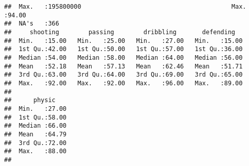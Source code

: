 \documentclass[
]{article}
\begin{document}
\begin{verbatim}
##  Max.   :195800000                                         Max.   :94.00  
##  NA's   :366                                                              
##     shooting        passing        dribbling       defending    
##  Min.   :15.00   Min.   :25.00   Min.   :27.00   Min.   :15.00  
##  1st Qu.:42.00   1st Qu.:50.00   1st Qu.:57.00   1st Qu.:36.00  
##  Median :54.00   Median :58.00   Median :64.00   Median :56.00  
##  Mean   :52.18   Mean   :57.13   Mean   :62.46   Mean   :51.71  
##  3rd Qu.:63.00   3rd Qu.:64.00   3rd Qu.:69.00   3rd Qu.:65.00  
##  Max.   :92.00   Max.   :92.00   Max.   :96.00   Max.   :89.00  
##                                                                 
##      physic     
##  Min.   :27.00  
##  1st Qu.:58.00  
##  Median :66.00  
##  Mean   :64.79  
##  3rd Qu.:72.00  
##  Max.   :88.00  
## 
\end{verbatim}
\end{document}
